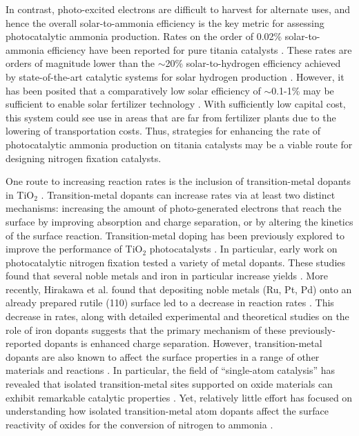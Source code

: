 In contrast, photo-excited electrons are difficult to harvest for alternate uses, and hence the overall solar-to-ammonia efficiency is the key metric for assessing photocatalytic ammonia production. Rates on the order of 0.02\% solar-to-ammonia efficiency have been reported for pure titania catalysts \cite{Hirakawa_2017}. These rates are orders of magnitude lower than the $\sim$20\% solar-to-hydrogen efficiency achieved by state-of-the-art catalytic systems for solar hydrogen production \cite{Nakamura_2015, Jia_2016}. However, it has been posited that a comparatively low solar efficiency of $\sim$0.1-1\% may be sufficient to enable solar fertilizer technology \cite{Comer_2019, Medford_2017}. With sufficiently low capital cost, this system could see use in areas that are far from fertilizer plants due to the lowering of transportation costs. Thus, strategies for enhancing the rate of photocatalytic ammonia production on titania catalysts may be a viable route for designing nitrogen fixation catalysts.

One route to increasing reaction rates is the inclusion of transition\hyp{}metal dopants in TiO$_2$ \cite{Zaleska_2008}.  Transition\hyp{}metal dopants can increase rates via at least two distinct mechanisms: increasing the amount of photo-generated electrons that reach the surface by improving absorption and charge separation, or by altering the kinetics of the surface reaction.
Transition-metal doping has been previously explored to improve the performance of TiO$_2$ photocatalysts \cite{Schneider_2014, Li_2007, Dozzi_2013}. In particular, early work on photocatalytic nitrogen fixation tested a variety of metal dopants. These studies found that several noble metals \cite{Ranjit_1996} and iron in particular increase yields \cite{Schrauzer_1977, Schrauzer_1983, Augugliaro_1982, Soria_1991, Ranjit_1996, Ranjit_1997}. More recently, Hirakawa et al. found that depositing noble metals (Ru, Pt, Pd) onto an already prepared rutile (110) surface led to a decrease in reaction rates \cite{Hirakawa_2017}. This decrease in rates, along with detailed experimental and theoretical studies on the role of iron dopants  \cite{Soria_1991, Comer_2018} suggests that the primary mechanism of these previously-reported dopants is enhanced charge separation. However, transition-metal dopants are also known to affect the surface properties in a range of other materials and reactions \cite{Khan_2018, Gu_2014, Ammal_2016, Gu_2017, Comer_2018, Garc_a_Mota_2011, Yao_2017}. In particular, the field of ``single-atom catalysis'' has revealed that isolated transition-metal sites supported on oxide materials can exhibit remarkable catalytic properties \cite{Liu_2016, Qiao_2011, O_Connor_2018}. Yet, relatively little effort has focused on understanding how isolated transition-metal atom dopants affect the surface reactivity of oxides for the conversion of nitrogen to ammonia \cite{Tao_2019, Liu_2019, Zhao_2019, Cheng_2019, Li_2017}.

